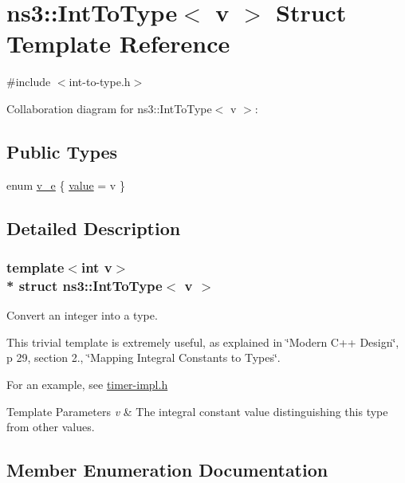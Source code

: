 \hypertarget{structns3_1_1IntToType}{}\section{ns3\+:\+:Int\+To\+Type$<$ v $>$ Struct Template Reference}
\label{structns3_1_1IntToType}


{\ttfamily \#include $<$int-\/to-\/type.\+h$>$}



Collaboration diagram for ns3\+:\+:Int\+To\+Type$<$ v $>$\+:
\subsection*{Public Types}
\begin{DoxyCompactItemize}
\item 
enum \hyperlink{structns3_1_1IntToType_ab6365e0b66da4eda3da3d0bac1a0b51b}{v\+\_\+e} \{ \hyperlink{structns3_1_1IntToType_ab6365e0b66da4eda3da3d0bac1a0b51ba0899a36a600d7537c6671f18c45627c4}{value} = v
 \}
\end{DoxyCompactItemize}


\subsection{Detailed Description}
\subsubsection*{template$<$int v$>$\\*
struct ns3\+::\+Int\+To\+Type$<$ v $>$}

Convert an integer into a type.

This trivial template is extremely useful, as explained in \char`\"{}\+Modern C++ Design\char`\"{}, p 29, section 2., \char`\"{}\+Mapping Integral Constants to Types\char`\"{}.

For an example, see \hyperlink{timer-impl_8h}{timer-\/impl.\+h}


\begin{DoxyTemplParams}{Template Parameters}
{\em v} & The integral constant value distinguishing this type from other values. \\
\hline
\end{DoxyTemplParams}


\subsection{Member Enumeration Documentation}
